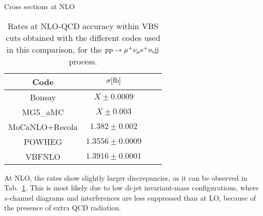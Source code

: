 Cross sections at NLO

\begin{table}[h!]
    \centering
    \begin{tabular}{c|c|c|c}
        Code  &  $\sigma[\rm{fb}]$  \\
        \hline
        \hline
        {\sc Bonsay}  &  $X \pm 0.0009$  \\
        {\sc MG5\_aMC}&  $X  \pm 0.003$  \\
        {\sc MoCaNLO+Recola}  &  $ 1.382 \pm 0.002$ \\
        {\sc POWHEG}  &  $1.3556 \pm 0.0009$  \\
        {\sc VBFNLO}  &  $1.3916 \pm 0.0001$  \\
    \end{tabular}
    \caption{\label{tab:wg1_NLOrates} Rates at NLO-QCD accuracy within VBS cuts obtained with the different codes used in this comparison, 
    for the ${\rm p}{\rm p}\to\mu^+\nu_\mu{\rm e}^+\nu_{\rm e}{\rm j}{\rm j}$ process.
    }
\end{table}

At NLO, the rates show slightly larger discrepancies, as it can be observed in Tab.~\ref{tab:wg1_NLOrates}.
This is most likely due to low di-jet invariant-mass configurations, where $s$-channel diagrams and interferences are less suppressed than at LO, because of the presence of extra QCD radiation.